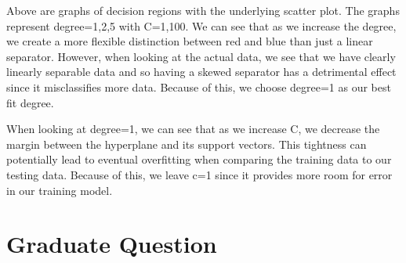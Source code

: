 \documentclass[11pt]{article}
\begin{document}
    Above are graphs of decision regions with the underlying scatter plot.
The graphs represent degree=1,2,5 with C=1,100. We can see that as we
increase the degree, we create a more flexible distinction between red
and blue than just a linear separator. However, when looking at the
actual data, we see that we have clearly linearly separable data and so
having a skewed separator has a detrimental effect since it
misclassifies more data. Because of this, we choose degree=1 as our best
fit degree.

When looking at degree=1, we can see that as we increase C, we decrease
the margin between the hyperplane and its support vectors. This
tightness can potentially lead to eventual overfitting when comparing
the training data to our testing data. Because of this, we leave c=1
since it provides more room for error in our training model.

    \section{Graduate Question}\label{graduate-question}
\end{document}
